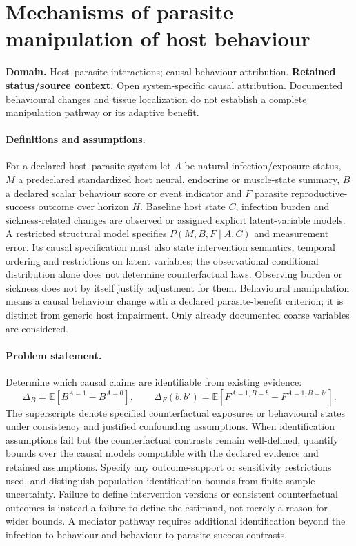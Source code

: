 \documentclass[11pt]{article}
\begin{document}
\section*{Mechanisms of parasite manipulation of host behaviour}
\label{prob:330}
\label{rank:210}
\par\smallskip

\noindent\textbf{Domain.} Host--parasite interactions; causal behaviour attribution. \quad \textbf{Retained status/source context.} Open system-specific causal attribution. Documented behavioural changes and tissue localization do not establish a complete manipulation pathway or its adaptive benefit.

\paragraph{Definitions and assumptions.} For a declared host--parasite system let $A$ be natural infection/exposure status, $M$ a predeclared standardized host neural, endocrine or muscle-state summary, $B$ a declared scalar behaviour score or event indicator and $F$ parasite reproductive-success outcome over horizon $H$. Baseline host state $C$, infection burden and sickness-related changes are observed or assigned explicit latent-variable models. A restricted structural model specifies $P(M,B,F\mid A,C)$ and measurement error. Its causal specification must also state intervention semantics, temporal ordering and restrictions on latent variables; the observational conditional distribution alone does not determine counterfactual laws. Observing burden or sickness does not by itself justify adjustment for them. Behavioural manipulation means a causal behaviour change with a declared parasite-benefit criterion; it is distinct from generic host impairment. Only already documented coarse variables are considered.

\paragraph{Problem statement.} Determine which causal claims are identifiable from existing evidence:
    \[\Delta_B=\mathbb{E}[B^{A=1}-B^{A=0}],\qquad
    \Delta_F(b,b')=\mathbb{E}[F^{A=1,B=b}-F^{A=1,B=b'}].\]
    The superscripts denote specified counterfactual exposures or behavioural states under consistency and justified confounding assumptions. When identification assumptions fail but the counterfactual contrasts remain well-defined, quantify bounds over the causal models compatible with the declared evidence and retained assumptions. Specify any outcome-support or sensitivity restrictions used, and distinguish population identification bounds from finite-sample uncertainty. Failure to define intervention versions or consistent counterfactual outcomes is instead a failure to define the estimand, not merely a reason for wider bounds. A mediator pathway requires additional identification beyond the infection-to-behaviour and behaviour-to-parasite-success contrasts.
\end{document}
